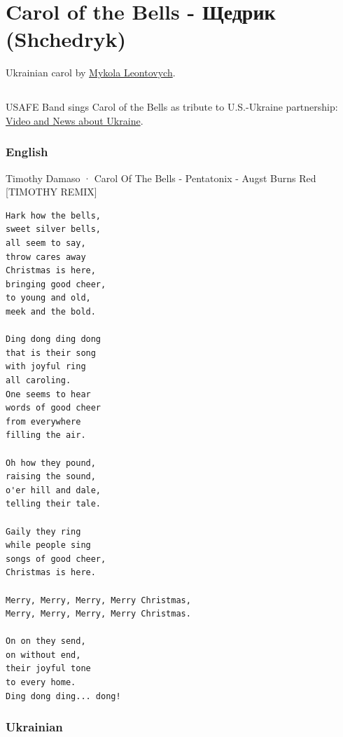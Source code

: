 \documentclass[
]{article}
\begin{document}
\hypertarget{carol-of-the-bells---ux449ux435ux434ux440ux438ux43a-shchedryk}{%
\section{Carol of the Bells - Щедрик
(Shchedryk)}\label{carol-of-the-bells---ux449ux435ux434ux440ux438ux43a-shchedryk}}

Ukrainian carol by
\href{https://en.wikipedia.org/wiki/Mykola_Leontovych}{Mykola
Leontovych}.

\hypertarget{section-19}{%
\subsection*{}\label{section-19}}

USAFE Band sings Carol of the Bells as tribute to U.S.-Ukraine
partnership:
\href{https://www.unian.info/society/christmas-greeting-to-ukraine-usafe-band-sings-carol-of-the-bells-11261930.html}{Video
and News about Ukraine}.

\hypertarget{english-4}{%
\subsubsection*{English}\label{english-4}}

Timothy Damaso · Carol Of The Bells - Pentatonix - Augst Burns Red
{[}TIMOTHY REMIX{]}

\begin{verbatim}
Hark how the bells, 
sweet silver bells, 
all seem to say, 
throw cares away
Christmas is here, 
bringing good cheer, 
to young and old, 
meek and the bold.

Ding dong ding dong 
that is their song 
with joyful ring 
all caroling.
One seems to hear 
words of good cheer 
from everywhere 
filling the air.

Oh how they pound, 
raising the sound, 
o'er hill and dale, 
telling their tale.

Gaily they ring 
while people sing 
songs of good cheer, 
Christmas is here.

Merry, Merry, Merry, Merry Christmas, 
Merry, Merry, Merry, Merry Christmas.

On on they send, 
on without end, 
their joyful tone 
to every home.
Ding dong ding... dong!
\end{verbatim}

\hypertarget{ukrainian-3}{%
\subsubsection*{Ukrainian}\label{ukrainian-3}}
\end{document}
